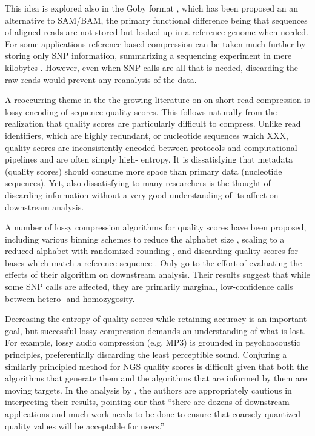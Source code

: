 \documentclass[twocolumn]{article}
\begin{document}

This idea is explored also in the Goby format \citep{Goby2012}, which has been
proposed an an alternative to SAM/BAM, the primary functional difference being
that sequences of aligned reads are not stored but looked up in a reference
genome when needed. For some applications reference-based compression can be
taken much further by storing only SNP information, summarizing a sequencing
experiment in mere kilobytes \citep{Christley2009}. However, even when SNP
calls are all that is needed, discarding the raw reads would prevent any
reanalysis of the data.



A reoccurring theme in the  the growing literature on on short read
compression is lossy encoding of sequence quality scores. This follows
naturally from the realization that quality scores are particularly difficult
to compress. Unlike read identifiers, which are highly redundant, or
nucleotide sequences which XXX, quality scores are inconsistently encoded
between protocols and computational pipelines and are often simply high-
entropy. It is dissatisfying that metadata (quality scores) should consume
more space than primary data (nucleotide sequences). Yet, also dissatisfying
to many researchers is the thought of discarding information without a very
good understanding of its affect on downstream analysis.

A number of lossy compression algorithms for quality scores have been
proposed, including various binning schemes to reduce the alphabet size
\citep{Wan2011}, scaling to a reduced alphabet with randomized rounding
\citep{Kozanitis2011}, and discarding quality scores for bases which match a
reference sequence \citep{Hsi-YangFritz2011}. Only \citet{Kozanitis2011} go to
the effort of evaluating the effects of their algorithm on downstream
analysis. Their results suggest that while some SNP calls are affected, they
are primarily marginal, low-confidence calls between hetero- and homozygosity.


Decreasing the entropy of quality scores while retaining accuracy is an
important goal, but successful lossy compression demands an understanding of
what is lost. For example, lossy audio compression (e.g. MP3) is grounded in
psychoacoustic principles, preferentially discarding the least perceptible
sound. Conjuring a similarly principled method for NGS quality scores is
difficult given that both the algorithms that generate them and the algorithms
that are informed by them are moving targets. In the analysis by
\citet{Kozanitis2011}, the authors are appropriately cautious in interpreting
their results, pointing our that ``there are dozens of downstream applications
and much work needs to be done to ensure that coarsely quantized quality
values will be acceptable for users.''
\end{document}
